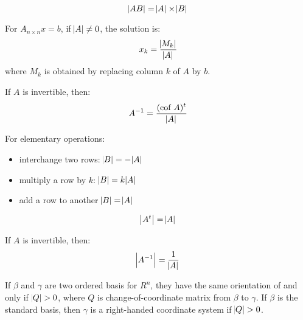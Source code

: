 \begin{theorem}
    \begin{equation}
        \abs{AB} = \abs{A} \times \abs{B}
    \end{equation}    
\end{theorem}


\begin{theorem}
    For $A_{n \times n}x=b$, if $\abs{A} \neq 0$, the solution is:
    \begin{equation}
        x_k = \frac{\abs{M_k}}{\abs{A}}
    \end{equation}
    where $M_k$ is obtained by replacing column $k$ of $A$ by $b$.
\end{theorem}

\begin{theorem}
    If $A$ is invertible, then:
    \begin{equation}
        {A}^{-1} = \frac{(\displaystyle \text{cof} ~\displaystyle A)^t}{\abs{A}}
    \end{equation}    
\end{theorem}


\begin{theorem}
  For elementary operations:
\begin{itemize}
    \item interchange two rows: $\abs{B} = - \abs{A}$ 
    \item multiply a row by $k$: $\abs{B} = k \abs{A}$
    \item add a row to another $\abs{B} = \abs{A}$
\end{itemize}  
\end{theorem}

\begin{theorem}
    \begin{equation}
        \abs{A^t} = \abs{A}
    \end{equation}    
\end{theorem}

\begin{theorem}
    If $A$ is invertible, then:
    \begin{equation}
        \abs{{A}^{-1}} = \frac{1}{\abs{A}}
    \end{equation}    
\end{theorem}




\begin{definition}
    If $\beta$ and $\gamma$ are two ordered basis for $R^n$, they have the same orientation of and only if $\abs{Q} > 0$, where $Q$ is change-of-coordinate matrix from $\beta$ to $\gamma$. If $\beta$ is the standard basis, then $\gamma$ is a right-handed coordinate system if $\abs{Q} > 0$.
\end{definition}


